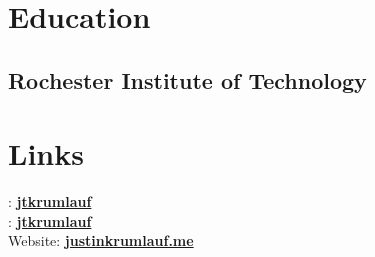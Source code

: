 \documentclass[letterpaper]{deedy-resume} %
\begin{document}
\begin{minipage}[t]{0.33\textwidth} %


\section{Education} 

\subsection{Rochester Institute \newline
of Technology}


\sectionspace %


\section{Links} 

\faGithub:  \href{https://github.com/jtkrumlauf}{\bf jtkrumlauf} \\
\faLinkedin: \href{https://www.linkedin.com/in/jtkrumlauf}{\bf jtkrumlauf} \\
Website: \href{justinkrumlauf.me}{\bf justinkrumlauf.me} \\

\sectionspace %







\end{minipage}
\end{document}
